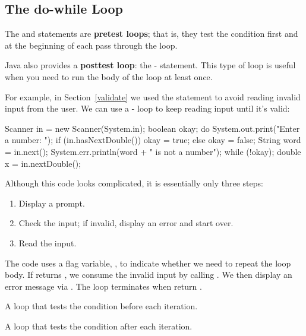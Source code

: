 \subsection*{The do-while Loop}


The  and  statements are {\bf pretest loops}; that is, they test the condition first and at the beginning of each pass through the loop.


Java also provides a {\bf posttest loop}: the - statement.
This type of loop is useful when you need to run the body of the loop at least once.


For example, in Section~\ref{validate} we used the  statement to avoid reading invalid input from the user.
We can use a - loop to keep reading input until it's valid:

\begin{code}
Scanner in = new Scanner(System.in);
boolean okay;
do {
    System.out.print("Enter a number: ");
    if (in.hasNextDouble()) {
        okay = true;
    } else {
        okay = false;
        String word = in.next();
        System.err.println(word + " is not a number");
    }
} while (!okay);
double x = in.nextDouble();
\end{code}

Although this code looks complicated, it is essentially only three steps:

\begin{enumerate}
\item Display a prompt.
\item Check the input; if invalid, display an error and start over.
\item Read the input.
\end{enumerate}


The code uses a flag variable, , to indicate whether we need to repeat the loop body.
If  returns , we consume the invalid input by calling .
We then display an error message via .
The loop terminates when  return .


\begin{description}

A loop that tests the condition before each iteration.

A loop that tests the condition after each iteration.

\end{description}


